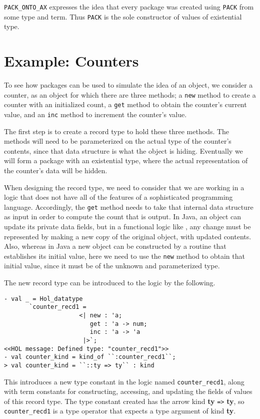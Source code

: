 \noindent
{\tt PACK\_ONTO\_AX} expresses the idea that every package was
created using {\tt PACK} from some type and term. Thus {\tt PACK}
is the sole constructor of values of existential type.

\newpage
\section{Example: Counters}

To see how packages can be used to simulate the idea of an object,
we consider a counter, as an object for which there are three methods;
a {\tt new} method to create a counter with an initialized count, 
a {\tt get} method to obtain the counter's current value, and
an {\tt inc} method to increment the counter's value.

The first step is to create a record type to hold these three methods.
The methods will need to be parameterized on the actual type 
of the counter's contents,
since that data structure is what the object is hiding.
Eventually we will form a package with an existential type,
where the actual representation of the counter's data
will be hidden.

When designing the record type, we need to consider 
that we are working in a logic that does not have all 
of the features of a sophisticated programming language.
Accordingly, the {\tt get} method needs to take that internal
data structure as input in order to compute the count that is output.
In Java, an object can update its private data fields, but in a
functional logic like \HOLW{}, any change must be represented by
making a new copy of the original object, with updated contents.
Also, whereas in Java a new object can be constructed by a
routine that establishes its initial value, here we need
to use the {\tt new} method to obtain that initial value,
since it must be of the unknown 
and parameterized 
type.

The new record type
can be introduced to the \HOLW{} logic by the following.
\begin{session}
\begin{verbatim}
- val _ = Hol_datatype
       `counter_recd1 =
                     <| new : 'a;
                        get : 'a -> num;
                        inc : 'a -> 'a
                      |>`;
<<HOL message: Defined type: "counter_recd1">>
- val counter_kind = kind_of ``:counter_recd1``;
> val counter_kind = ``::ty => ty`` : kind
\end{verbatim}
\end{session}
This introduces a new type constant in the \HOLW{} logic
named {\tt counter\_recd1}, along with term constants for
constructing, accessing, and updating 
the fields of values of this record type.
The type constant created
has the arrow kind {\bf ty} {\tt =>} {\bf ty}, so {\tt counter\_recd1}
is a type operator that expects a type argument of kind {\bf ty}.

